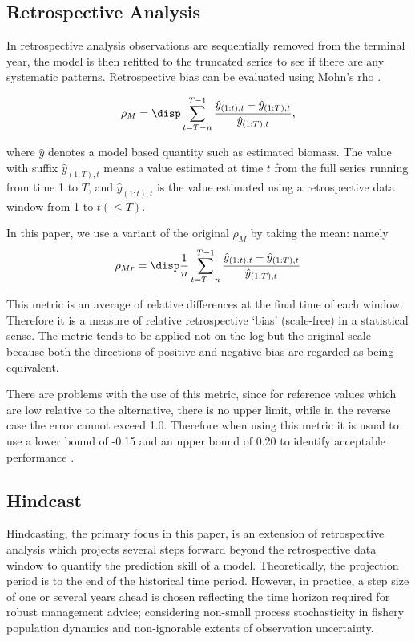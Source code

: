 \subsection*{Retrospective Analysis}

In retrospective analysis observations are sequentially removed from the terminal year, the model is then refitted to the truncated series to see if there are any systematic patterns. Retrospective bias can be evaluated using Mohn's rho \parencite{mohn1999retrospective}.

\begin{equation}
\label{eqn:mohn0}
\rho_M = \disp \sum_{t=T-n}^{T-1} \frac{\hat{y}_{(1:t),t}-\hat{y}_{(1:T),t}}{\hat{y}_{(1:T),t}}, 
\end{equation}

\noindent
where $\hat{y}$ denotes a model based quantity such as estimated biomass. The value with suffix $\hat{y}_{(1:T),t}$ means a value estimated at time $t$ from the full series running from time 1 to $T$, and $\hat{y}_{(1:t),t}$ is the value estimated using a retrospective data window from 1 to $t (\leq T)$. 

In this paper, we use a variant of the original $\rho_M$ by taking the mean: namely 
\begin{equation}
\label{eqn:mohn}
\rho_{Mr} = \disp \frac{1}{n} \sum_{t=T-n}^{T-1} \frac{\hat{y}_{(1:t),t}-\hat{y}_{(1:T),t}}{\hat{y}_{(1:T),t}} 
\end{equation}

This metric is an average of relative differences at the final time of each window. Therefore it is a measure of relative retrospective `bias' (scale-free) in a statistical sense. The metric tends to be applied not on the log but the original scale because both the directions of positive and negative bias are regarded as being equivalent.

There are problems with the use of this metric, since for reference values which are low relative to the alternative, there is no upper limit, while in the reverse case the error cannot exceed 1.0. Therefore when using this metric it is usual to use a lower bound of -0.15 and an upper bound of 0.20 to identify acceptable performance \parencite{hurtado2014looking}.

\subsection*{Hindcast}

Hindcasting, the primary focus in this paper, is an extension of retrospective analysis which projects several steps forward beyond the retrospective data window to quantify the prediction skill of a model. Theoretically, the projection period is to the end of the historical time period. However, in practice, a step size of one or several years ahead is chosen reflecting the time horizon required for robust management advice; considering non-small process stochasticity in fishery population dynamics and non-ignorable extents of observation uncertainty. 

